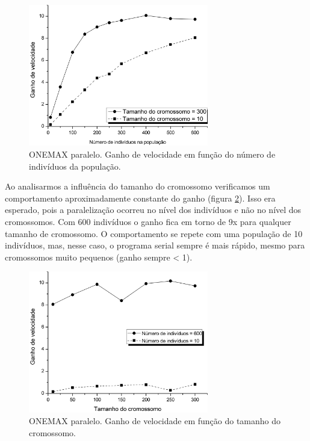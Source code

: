 \begin{figure}[htbp]
	\centering
		\includegraphics[width=0.70\textwidth]{figs/resultados/onemax/ganhoNumInd.png}
	\caption{ONEMAX paralelo. Ganho de velocidade em função do número de indivíduos da população.}
	\label{fig:ganhoNumInd}
\end{figure}

	Ao analisarmos a influência do tamanho do cromossomo verificamos um comportamento aproximadamente constante do ganho (figura \ref{fig:ganhoTamCromo}). Isso era esperado, pois a paralelização ocorreu no nível dos indivíduos e não no nível dos cromossomos. Com 600 indivíduos o ganho fica em torno de 9x para qualquer tamanho de cromossomo. O comportamento se repete com uma população de 10 indivíduos, mas, nesse caso, o programa serial sempre é mais rápido, mesmo para cromossomos muito pequenos (ganho sempre < 1). 
		
	\begin{figure}[htbp]
		\centering
			\includegraphics[width=0.70\textwidth]{figs/resultados/onemax/ganhoTamCromo.png}
		\caption{ONEMAX paralelo. Ganho de velocidade em função do tamanho do cromossomo.}
		\label{fig:ganhoTamCromo}
	\end{figure}